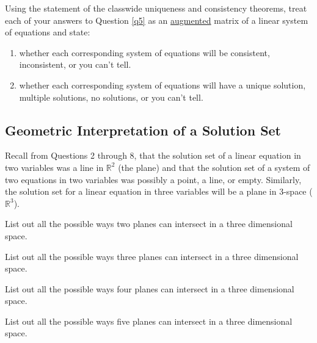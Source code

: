 \eq
\bq Using the statement of the classwide uniqueness and consistency theorems, treat each of your answers to Question \ref{q5} as an \underline{augmented} matrix of a linear system of equations and state:
\begin{enumerate}
\item whether each corresponding system of equations will be consistent, inconsistent, or you can't tell.
\item whether each corresponding system of equations will have a unique solution, multiple solutions, no solutions, or you can't tell.
\end{enumerate}
\eq

\subsection{Geometric Interpretation of a Solution Set}

Recall from Questions 2 through 8, that the solution set of a linear equation in two variables was a line in $\mathbb{R}^2$ (the plane) and that the solution set of a system of two equations in two variables was possibly a point, a line, or empty. Similarly, the solution set for a linear equation in three variables will be a plane in 3-space ($\mathbb{R}^3$).

\begin{question}\be
\item List out all the possible ways two planes can intersect in a three dimensional space.
\item List out all the possible ways three planes can intersect in a three dimensional space.
\item List out all the possible ways four planes can intersect in a three dimensional space.
\item List out all the possible ways five planes can intersect in a three dimensional space.
\begin{annotation}
\end{annotation}
\ee
\end{question}

